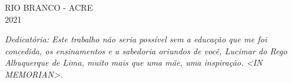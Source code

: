 \documentclass[
	12pt,				%
	openright,			%
	oneside,			%
	a4paper,			%
	english,			%
	french,				%
	spanish,			%
	brazil				%
	]{abntex2}
\begin{document}
\begin{center}
	\vspace{4mm}
	RIO BRANCO - ACRE \\
	2021
	
\end{center}
\clearpage
\begin{dedicatoria}
   \vspace*{\fill}
   \centering
   \noindent
   \textit{ Dedicat\'oria: Este trabalho não seria possível sem a educação que me foi concedida, os ensinamentos e a sabedoria oriundos de você, Lucimar do Rego Albuquerque de Lima, muito mais que uma mãe, uma inspiração. <IN MEMORIAN>.} \vspace*{\fill}
\end{dedicatoria}
\end{document}
